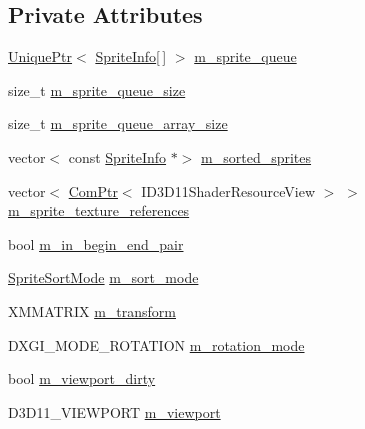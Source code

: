 \subsection*{Private Attributes}
\begin{DoxyCompactItemize}
\item 
\hyperlink{namespacemage_a8c307fbcc33bce9b7f2aa4c26c3b95cf}{Unique\+Ptr}$<$ \hyperlink{structmage_1_1_sprite_info}{Sprite\+Info}\mbox{[}$\,$\mbox{]} $>$ \hyperlink{classmage_1_1_sprite_batch_a67ab116e403b626771f03f527efa6f2f}{m\+\_\+sprite\+\_\+queue}
\item 
size\+\_\+t \hyperlink{classmage_1_1_sprite_batch_a0d7dadf01e3b905072c1aaa6b8e42c0e}{m\+\_\+sprite\+\_\+queue\+\_\+size}
\item 
size\+\_\+t \hyperlink{classmage_1_1_sprite_batch_a207760f2e11b1ea199529c65c9b21b3b}{m\+\_\+sprite\+\_\+queue\+\_\+array\+\_\+size}
\item 
vector$<$ const \hyperlink{structmage_1_1_sprite_info}{Sprite\+Info} $\ast$$>$ \hyperlink{classmage_1_1_sprite_batch_a65ad09d31c928ab1522d8b2c0c509b9a}{m\+\_\+sorted\+\_\+sprites}
\item 
vector$<$ \hyperlink{namespacemage_ae74f374780900893caa5555d1031fd79}{Com\+Ptr}$<$ I\+D3\+D11\+Shader\+Resource\+View $>$ $>$ \hyperlink{classmage_1_1_sprite_batch_ad8a5bb3b418c2cad84fecac0979a600c}{m\+\_\+sprite\+\_\+texture\+\_\+references}
\item 
bool \hyperlink{classmage_1_1_sprite_batch_a2f4e56ee07ef37a2906c552b0ea78403}{m\+\_\+in\+\_\+begin\+\_\+end\+\_\+pair}
\item 
\hyperlink{namespacemage_a256fa5833eecc408923de7ffadb5e014}{Sprite\+Sort\+Mode} \hyperlink{classmage_1_1_sprite_batch_a0b2b16b0d9eb63501b6fc0f9ce85e022}{m\+\_\+sort\+\_\+mode}
\item 
X\+M\+M\+A\+T\+R\+IX \hyperlink{classmage_1_1_sprite_batch_ad8a12f1f6c8289548346d469c9436c58}{m\+\_\+transform}
\item 
D\+X\+G\+I\+\_\+\+M\+O\+D\+E\+\_\+\+R\+O\+T\+A\+T\+I\+ON \hyperlink{classmage_1_1_sprite_batch_ae062f178efe4a3af9c1573f8f8c4deee}{m\+\_\+rotation\+\_\+mode}
\item 
bool \hyperlink{classmage_1_1_sprite_batch_a36c02637431746043ed6549c9b622550}{m\+\_\+viewport\+\_\+dirty}
\item 
D3\+D11\+\_\+\+V\+I\+E\+W\+P\+O\+RT \hyperlink{classmage_1_1_sprite_batch_a3029ab1ee01ccfc69fef88eb78d5bfc0}{m\+\_\+viewport}
\end{DoxyCompactItemize}


